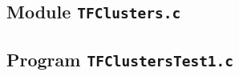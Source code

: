 \subsection{Module \texttt{TFClusters.c}}
\label{ss:TFClusters.c} 



\newpage
\subsection{Program \texttt{TFClustersTest1.c}}




